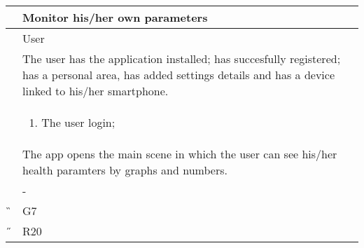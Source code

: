 \begin{center}
	\begin{longtable}{ | p{} | p{} | }
		\hline
		 \A &  Monitor his/her own parameters\\ 

		\hline
		 \B &  User \\ 

		\hline
  		 \C &    The user has the application installed; has succesfully registered; has a personal area, has added settings details and has a device linked to his/her smartphone.\\

		\hline
		\D & \begin{enumerate}
			\item The user login;
		\end{enumerate} \\

		\hline
		\E & The app opens the main scene in which the user can see his/her health paramters by graphs and numbers.\\

		\hline
		\F & - \\
		
		\hline
		\G & G7\\

		\hline
		\H & R20\\
		\hline

	\end{longtable}
\end{center}